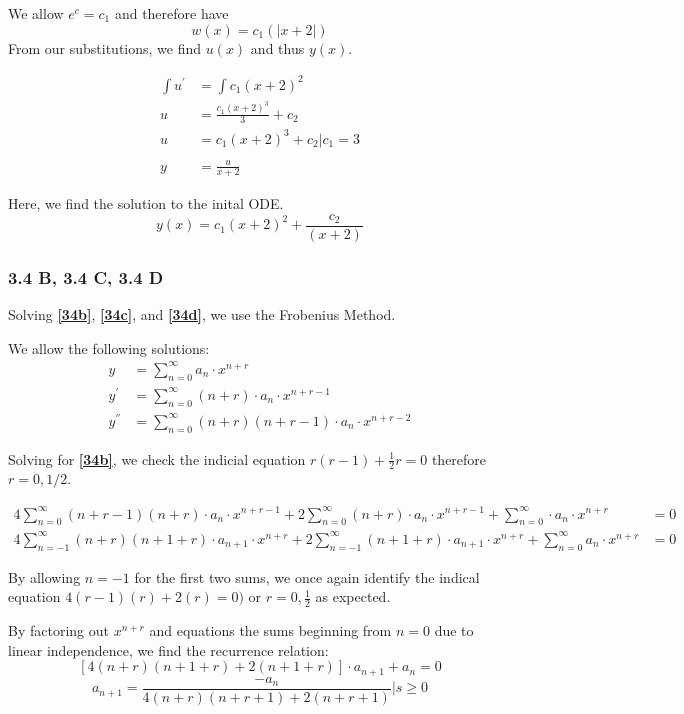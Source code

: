 \documentclass{article}
\begin{document}
We allow $e^c = c_1$ and therefore have
$$ w(x) = c_1(\left|x+2\right|) $$
From our substitutions, we find $u(x)$ and thus $y(x)$.

\begin{align*}
\int{u^{'}} &= \int{c_1(x+2)^2}\\
u &= \frac{c_1(x+2)^3}{3} + c_2\\
u &= c_1(x+2)^3 + c_2 \Bigr|c_1 = 3\\\\
y &= \frac{u}{x+2}
\end{align*}

Here, we find the solution to the inital ODE.
\[
y(x) = c_1(x+2)^2 + \frac{c_2}{(x+2)}
\]

\subsubsection*{3.4 B, 3.4 C, 3.4 D}
Solving \textbf{\ref{34b}}, \textbf{\ref{34c}}, and \textbf{\ref{34d}}, we use the Frobenius Method.

We allow the following solutions:
\begin{align}\label{frobenius}
y &= \sum_{n=0}^{\infty}{a_n\cdot x^{n+r}}\\
y^{'} &= \sum_{n=0}^{\infty}{(n+r) \cdot a_n \cdot x^{n+r-1}}\\
y^{''} &= \sum_{n=0}^{\infty}{(n+r)(n+r-1) \cdot a_n \cdot x^{n+r-2}}
\end{align}

Solving for \textbf{\ref{34b}}, we check the indicial equation $r(r-1)+\frac{1}{2}r = 0$ therefore $r =0,1/2$.

\begin{align*}
4\sum_{n=0}^{\infty}(n+r-1)(n+r) \cdot a_n \cdot x^{n+r-1} + 2\sum_{n=0}^{\infty}(n+r) \cdot a_n \cdot x^{n+r-1} + \sum_{n=0}^{\infty} \cdot a_n \cdot x^{n+r} &= 0 \\
4\sum_{n=-1}^{\infty}(n+r)(n+1+r) \cdot a_{n+1} \cdot x^{n+r} + 2\sum_{n=-1}^{\infty} (n+1+r) \cdot a_{n+1} \cdot x^{n+r} + \sum_{n=0}^{\infty} a_n \cdot x^{n+r} &= 0
\end{align*}

By allowing $n=-1$ for the first two sums, we once again identify the indical equation $4(r-1)(r) + 2(r) = 0)$ or $r=0,\frac{1}{2}$ as expected.

By factoring out $x^{n+r}$ and equations the sums beginning from $n=0$ due to linear independence, we find the recurrence relation:
\[
\left[4(n+r)(n+1+r)+2(n+1+r)\right] \cdot a_{n+1} + a_n = 0
\]
\begin{equation}\label{34be}
a_{n+1} = \frac{-a_n}{4(n+r)(n+r+1)+2(n+r+1)} \Bigr| s\geq0
\end{equation}
\end{document}
